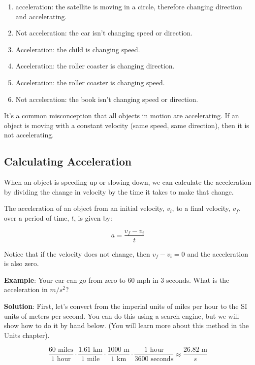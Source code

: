 \begin{Answer}[ref = accel]
\begin{enumerate}
\item acceleration: the satellite is moving in a circle, therefore changing 
direction and accelerating.
\item Not acceleration: the car isn't changing speed or direction.
\item Acceleration: the child is changing speed.
\item Acceleration: the roller coaster is changing direction.
\item Acceleration: the roller coaster is changing speed. 
\item Not acceleration: the book isn't changing speed or direction.
\end{enumerate}
\end{Answer}

It's a common misconception that all objects in motion are accelerating. If an 
object is moving with a constant velocity (same speed, same direction), then it 
is not accelerating. 

\subsection{Calculating Acceleration}
When an object is speeding up or slowing down, we can calculate the acceleration 
by dividing the change in velocity by the time it takes to make that change. 

\begin{mdframed}[style = important, frametitle = {Calculating Acceleration}]
The acceleration of an object from an initial velocity, $v_i$, to a final
velocity, $v_f$, over a period of time, $t$, is given by:

$$a = \frac{v_f - v_i}{t}$$
\end{mdframed}

Notice that if the velocity does not change, then $v_f - v_i = 0$ and the 
acceleration is also zero.

\textbf{Example}: Your car can go from zero to 60 mph in 3 seconds. What is the
acceleration in $m / s^2$?

\textbf{Solution}: First, let's convert from the imperial units of miles per
hour to the SI units of meters per second. You can do this using a search engine, 
but we will show how to do it by hand below. (You will learn more about this 
method in the Units chapter).

$$\frac{60 \text{ miles}}{1 \text{ hour}} \cdot \frac{1.61 \text{ km}}{1 
\text{ mile}} \cdot \frac{1000\text{ m}}{1\text{ km}} \cdot \frac{1\text{ hour}}{
3600\text{ seconds}} \approx \frac{26.82\text{ m}}{s}$$

